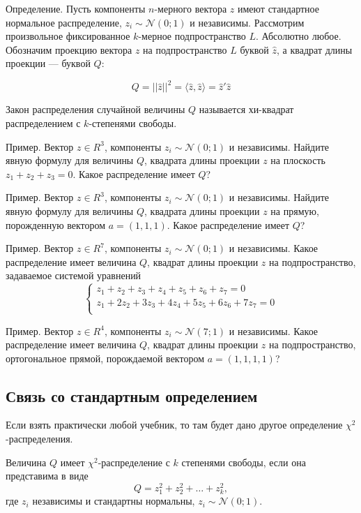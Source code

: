 \documentclass[11pt,russian,]{article}
\newcommand{\cN}{\mathcal{N}}
\newcommand{\1}{\mathbbm{1}}
\begin{document}
Определение. Пусть компоненты \(n\)-мерного вектора \(z\) имеют
стандартное нормальное распределение, \(z_i \sim \cN(0;1)\) и
независимы. Рассмотрим произвольное фиксированное \(k\)-мерное
подпространство \(L\). Абсолютно любое. Обозначим проекцию вектора \(z\)
на подпространство \(L\) буквой \(\hat z\), а квадрат длины проекции ---
буквой \(Q\):

\[
Q = ||\hat z||^2 = \langle \hat z, \hat z\rangle = \hat z'\hat z
\]

Закон распределения случайной величины \(Q\) называется хи-квадрат
распределением с \(k\)-степенями свободы.

Пример. Вектор \(z \in R^3\), компоненты \(z_i \sim \cN(0;1)\) и
независимы. Найдите явную формулу для величины \(Q\), квадрата длины
проекции \(z\) на плоскость \(z_1 + z_2 + z_3 =0\). Какое распределение
имеет \(Q\)?

Пример. Вектор \(z \in R^3\), компоненты \(z_i \sim \cN(0;1)\) и
независимы. Найдите явную формулу для величины \(Q\), квадрата длины
проекции \(z\) на прямую, порожденную вектором \(a = (1, 1, 1)\). Какое
распределение имеет \(Q\)?

Пример. Вектор \(z \in R^7\), компоненты \(z_i \sim \cN(0;1)\) и
независимы. Какое распределение имеет величина \(Q\), квадрат длины
проекции \(z\) на подпространство, задаваемое системой уравнений \[
\begin{cases}
z_1 + z_2 + z_3 +z_4 + z_5 +z_6 + z_7 = 0 \\
z_1 + 2z_2 +3z_3 +4z_4 +5z_5+6z_6+7z_7 =0 \\
\end{cases}
\]

Пример. Вектор \(z \in R^4\), компоненты \(z_i \sim \cN(7;1)\) и
независимы. Какое распределение имеет величина \(Q\), квадрат длины
проекции \(z\) на подпространство, ортогональное прямой, порождаемой
вектором \(a=(1, 1, 1, 1)\)?

\subsection{Связь со стандартным определением}\label{---}

Если взять практически любой учебник, то там будет дано другое
определение \(\chi^2\)-распределения.

Величина \(Q\) имеет \(\chi^2\)-распределение с \(k\) степенями свободы,
если она представима в виде \[
Q = z_1^2 + z_2^2 + \ldots + z_k^2,
\] где \(z_i\) независимы и стандартны нормальны, \(z_i \sim \cN(0;1)\).
\end{document}
